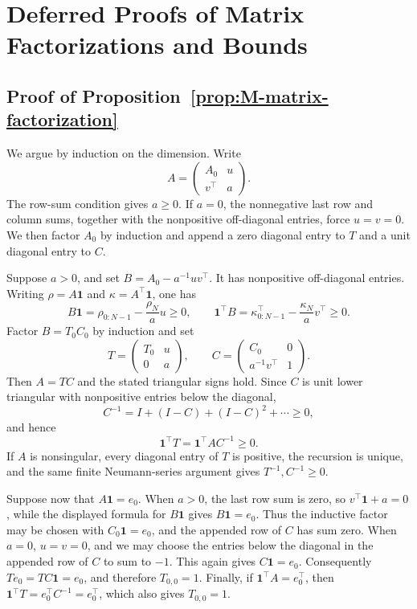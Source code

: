\documentclass[11pt]{article}
\begin{document}
\section{Deferred Proofs of Matrix Factorizations and Bounds} \label{app:LA}

\subsection{Proof of Proposition~\ref{prop:M-matrix-factorization}}
We argue by induction on the dimension. Write
\[
A=\begin{pmatrix}A_0&u\\v^\top&a\end{pmatrix}.
\]
The row-sum condition gives $a\geq0$. If $a=0$, the nonnegative last row and column sums, together with the nonpositive off-diagonal entries, force $u=v=0$. We then factor $A_0$ by induction and append a zero diagonal entry to $T$ and a unit diagonal entry to $C$.

Suppose $a>0$, and set $B=A_0-a^{-1}uv^\top$. It has nonpositive off-diagonal entries. Writing $\rho=A\mathbf1$ and $\kappa=A^\top\mathbf1$, one has
\[
B\mathbf1=\rho_{0:N-1}-\frac{\rho_N}{a}u\geq0,
\qquad
\mathbf1^\top B=\kappa_{0:N-1}^\top-\frac{\kappa_N}{a}v^\top\geq0.
\]
Factor $B=T_0C_0$ by induction and set
\[
T=\begin{pmatrix}T_0&u\\0&a\end{pmatrix},
\qquad
C=\begin{pmatrix}C_0&0\\a^{-1}v^\top&1\end{pmatrix}.
\]
Then $A=TC$ and the stated triangular signs hold. Since $C$ is unit lower triangular with nonpositive entries below the diagonal,
\[
C^{-1}=I+(I-C)+(I-C)^2+\cdots\geq0,
\]
and hence
\[
\mathbf1^\top T=\mathbf1^\top AC^{-1}\geq0.
\]
If $A$ is nonsingular, every diagonal entry of $T$ is positive, the recursion is unique, and the same finite Neumann-series argument gives $T^{-1},C^{-1}\geq0$.

Suppose now that $A\mathbf1=e_0$. When $a>0$, the last row sum is zero, so $v^\top\mathbf1+a=0$, while the displayed formula for $B\mathbf1$ gives $B\mathbf1=e_0$. Thus the inductive factor may be chosen with $C_0\mathbf1=e_0$, and the appended row of $C$ has sum zero. When $a=0$, $u=v=0$, and we may choose the entries below the diagonal in the appended row of $C$ to sum to $-1$. This again gives $C\mathbf1=e_0$. Consequently $Te_0=TC\mathbf1=e_0$, and therefore $T_{0,0}=1$. Finally, if $\mathbf1^\top A=e_0^\top$, then
$\mathbf1^\top T=e_0^\top C^{-1}=e_0^\top$, which also gives $T_{0,0}=1$.
\end{document}

